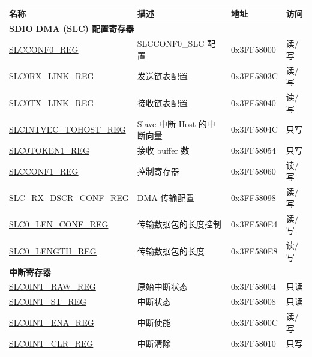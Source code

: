 \documentclass[sdio_slave.tex]{subfiles}
\begin{document}
\begin{longtable}{ |m{5cm} |m{7cm} | m{2cm} |m{1cm} | }
\hline\rowcolor{lightgray}
名称 & 描述 &  地址 & 访问 \\ \hline
\multicolumn{4}{|l|}{\textbf{SDIO DMA (SLC) 配置寄存器}} \\ \hline
\hyperref[regdesc:SLCCONF0SLCCONF0REG]{SLCCONF0\_REG} & SLCCONF0\_SLC 配置& 0x3FF58000 & 读/写 \\ \hline
\hyperref[regdesc:SLC0RXLINKREG]{SLC0RX\_LINK\_REG} & 发送链表配置 & 0x3FF5803C & 读/写 \\ \hline
\hyperref[regdesc:SLC0TXLINKREG]{SLC0TX\_LINK\_REG} & 接收链表配置 & 0x3FF58040 & 读/写 \\ \hline
\hyperref[regdesc:SLCINTVECTOHOSTREG]{SLCINTVEC\_TOHOST\_REG} & Slave 中断 Host 的中断向量 & 0x3FF5804C & 只写 \\ \hline
\hyperref[regdesc:SLC0TOKEN1SLC0TOKEN1REG]{SLC0TOKEN1\_REG} & 接收 buffer 数  & 0x3FF58054 & 只写 \\ \hline
\hyperref[regdesc:SLCCONF1SLCCONF1REG]{SLCCONF1\_REG}& 控制寄存器&0x3FF58060&读/写\\ \hline
\hyperref[regdesc:SLCRXDSCRCONFREG]{SLC\_RX\_DSCR\_CONF\_REG}&DMA 传输配置&0x3FF58098&读/写\\ \hline
\hyperref[regdesc:SLC0LENCONFREG]{SLC0\_LEN\_CONF\_REG}&传输数据包的长度控制 &0x3FF580E4&读/写\\ \hline
\hyperref[regdesc:SLC0LENGTHREG]{SLC0\_LENGTH\_REG}&传输数据包的长度 &0x3FF580E8&读/写\\ \hline
\multicolumn{4}{|l|}{\textbf{中断寄存器}} \\ \hline
\hyperref[regdesc:SLC0INTRAWREG]{SLC0INT\_RAW\_REG} & 原始中断状态 & 0x3FF58004 & 只读 \\ \hline
\hyperref[regdesc:SLC0INTSTREG]{SLC0INT\_ST\_REG} & 中断状态 & 0x3FF58008 & 只读 \\ \hline
\hyperref[regdesc:SLC0INTENAREG]{SLC0INT\_ENA\_REG} & 中断使能 & 0x3FF5800C & 读/写 \\ \hline
\hyperref[regdesc:SLC0INTCLRREG]{SLC0INT\_CLR\_REG} & 中断清除 & 0x3FF58010 & 只写 \\ \hline
\end{longtable}
\end{document}
